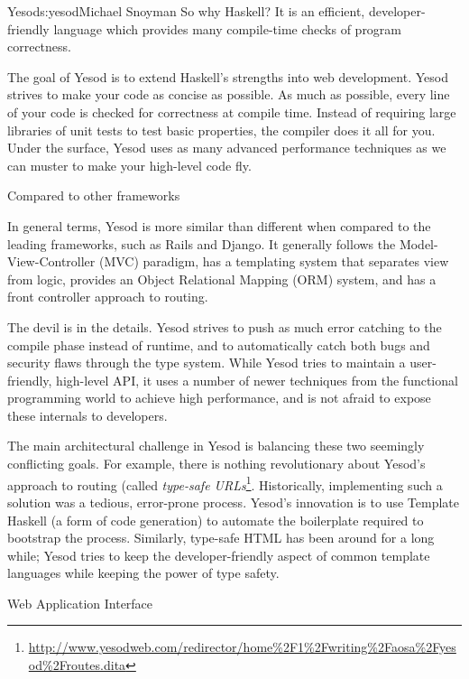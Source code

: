 \begin{aosachapter}{Yesod}{s:yesod}{Michael Snoyman}
So why Haskell? It is an efficient, developer-friendly language which
provides many compile-time checks of program correctness.

The goal of Yesod is to extend Haskell's strengths into web
development. Yesod strives to make your code as concise as
possible. As much as possible, every line of your code is checked for
correctness at compile time. Instead of requiring large libraries of
unit tests to test basic properties, the compiler does it all for
you. Under the surface, Yesod uses as many advanced performance
techniques as we can muster to make your high-level code fly.

\begin{aosasect1}{Compared to other frameworks}

In general terms, Yesod is more similar than different when compared
to the leading frameworks, such as Rails and Django. It generally
follows the Model-View-Controller (MVC) paradigm, has a templating
system that separates view from logic, provides an Object Relational
Mapping (ORM) system, and has a front controller approach to routing.

The devil is in the details. Yesod strives to push as much error
catching to the compile phase instead of runtime, and to automatically
catch both bugs and security flaws through the type system. While
Yesod tries to maintain a user-friendly, high-level API, it uses a
number of newer techniques from the functional programming world to
achieve high performance, and is not afraid to expose these internals
to developers.

The main architectural challenge in Yesod is balancing these two
seemingly conflicting goals. For example, there is nothing
revolutionary about Yesod's approach to routing (called
\emph{type-safe URLs}\footnote{\url{http://www.yesodweb.com/redirector/home\%2F1\%2Fwriting\%2Faosa\%2Fyesod\%2Froutes.dita}}.
Historically, implementing such a solution was a tedious, error-prone
process. Yesod's innovation is to use Template Haskell (a form of code
generation) to automate the boilerplate required to bootstrap the
process. Similarly, type-safe HTML has been around for a long while;
Yesod tries to keep the developer-friendly aspect of common template
languages while keeping the power of type safety.

\end{aosasect1}

\begin{aosasect1}{Web Application Interface}


\end{aosasect1}
\end{aosachapter}
